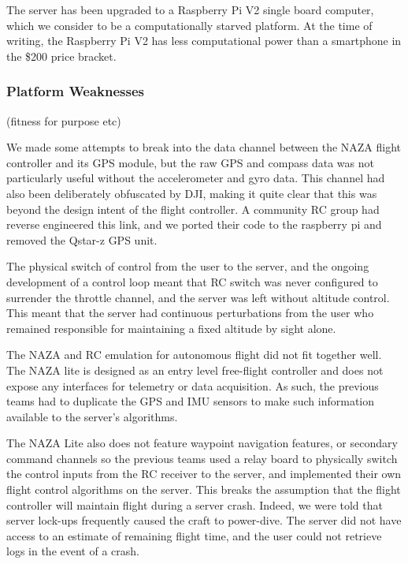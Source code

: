 \documentclass[a4paper, 11pt, titlepage]{article}
\begin{document}
      The server has been upgraded to a Raspberry Pi V2 single board computer, which we consider to be a computationally starved platform.  At the time of writing, the Raspberry Pi V2 has less computational power than a smartphone in the \$200 price bracket.

    \subsubsection{Platform Weaknesses}
      (fitness for purpose etc)

      We made some attempts to break into the data channel between the NAZA flight controller and its GPS module, but the raw GPS and compass data was not particularly useful without the accelerometer and gyro data.  This channel had also been deliberately obfuscated by DJI, making it quite clear that this was beyond the design intent of the flight controller.  A community RC group had reverse engineered this link, and we ported their code to the raspberry pi and removed the Qstar-z GPS unit.
      
      The physical switch of control from the user to the server, and the ongoing development of a control loop meant that RC switch was never configured to surrender the throttle channel, and the server was left without altitude control.  This meant that the server had continuous perturbations from the user who remained responsible for maintaining a fixed altitude by sight alone.

      The NAZA and RC emulation for autonomous flight did not fit together well. The NAZA lite is designed as an entry level free-flight controller and does not expose any interfaces for telemetry or data acquisition.  As such, the previous teams had to duplicate the GPS and IMU sensors to make such information available to the server's algorithms.

      The NAZA Lite also does not feature waypoint navigation features, or secondary command channels so the previous teams used a relay board to physically switch the control inputs from the RC receiver to the server, and implemented their own flight control algorithms on the server.
      This breaks the assumption that the flight controller will maintain flight during a server crash.  Indeed, we were told that server lock-ups frequently caused the craft to power-dive.
      The server did not have access to an estimate of remaining flight time, and the user could not retrieve logs in the event of a crash.
\end{document}
